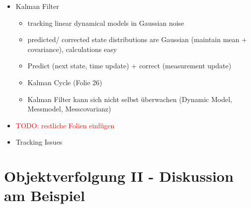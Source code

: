 \documentclass{report}
\newcommand{\todo}[2][red]{\textcolor{#1}{TODO: #2}}
\begin{document}
\begin{itemize}
		\item Kalman Filter
		\begin{itemize}
			\item tracking linear dynamical models in Gaussian noise
			\item predicted/ corrected state distributions are Gaussian (maintain mean + covariance), calculations easy
			\item Predict (next state, time update) + correct (measurement update)
			\item Kalman Cycle (Folie 26)
			\item Kalman Filter kann sich nicht selbst überwachen (Dynamic Model, Messmodel, Messcovarianz)
		\end{itemize}
		
		\item \todo{restliche Folien einfügen}
		\item Tracking Issues
	\end{itemize}
	\newpage
	
	\section{Objektverfolgung II - Diskussion am Beispiel}
	
\end{document}

